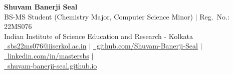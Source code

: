 \documentclass[a4paper,10.8pt]{article}
\begin{document}
\selectfont

\begin{center}
    \textbf{\Large Shuvam Banerji Seal}\\[0.3em]
    \small{
        BS-MS Student (Chemistry Major, Computer Science Minor) $\mid$ Reg.\ No.: 22MS076\\[0.2em]
        Indian Institute of Science Education and Research - Kolkata\\[0.2em]
        \href{mailto:sbs22ms076@iiserkol.ac.in}{\faEnvelope\ sbs22ms076@iiserkol.ac.in} $\mid$
        \href{https://github.com/Shuvam-Banerji-Seal}{\faGithub\ github.com/Shuvam-Banerji-Seal} $\mid$
        \href{https://www.linkedin.com/in/mastersbs}{\faLinkedin\ linkedin.com/in/mastersbs} $\mid$ \\
        \href{https://shuvam-banerji-seal.github.io}{\faGlobe\ shuvam-banerji-seal.github.io}
    }
\end{center}
\end{document}
